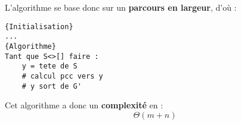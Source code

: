 L'algorithme se base donc sur un \textbf{parcours en  largeur}, d'où :

\begin{lstlisting}
{Initialisation}
...
{Algorithme}
Tant que S<>[] faire :
    y = tete de S 
    # calcul pcc vers y 
    # y sort de G'
\end{lstlisting}

Cet algorithme a donc un \textbf{complexité} en : 
    $$ \Theta(m + n) $$

